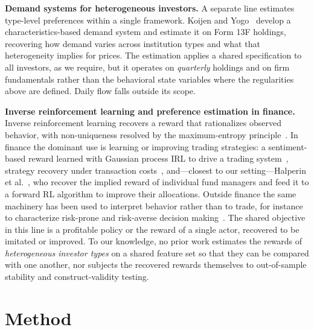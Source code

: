 \documentclass[sigconf,anonymous,review]{acmart}
\begin{document}
\textbf{Demand systems for heterogeneous investors.} A separate line
estimates type-level preferences within a single framework. Koijen and
Yogo~\cite{koijen_yogo2019} develop a characteristics-based demand system
and estimate it on Form 13F holdings, recovering how demand varies across
institution types and what that heterogeneity implies for prices. The
estimation applies a shared specification to all investors, as we
require, but
it operates on \emph{quarterly} holdings and on firm fundamentals rather
than the behavioral state variables where the regularities above are
defined. Daily flow falls outside its scope.

\textbf{Inverse reinforcement learning and preference estimation in
finance.} Inverse reinforcement learning recovers a reward that
rationalizes observed behavior, with non-uniqueness resolved by the
maximum-entropy principle~\cite{ziebart2008}. In finance the dominant use is
learning or improving trading strategies: a sentiment-based reward
learned with Gaussian process IRL to drive a trading
system~\cite{yang2018gpirl}, strategy recovery under transaction
costs~\cite{sun2023transaction}, and---closest to our setting---Halperin
et al.~\cite{halperin2022}, who recover the implied reward of individual
fund managers and feed it to a forward RL algorithm to improve their
allocations. Outside finance the same machinery has been used to
interpret behavior rather than to trade, for instance to characterize
risk-prone and risk-averse decision making~\cite{liu2019risk}. The shared objective in this line is a profitable policy or
the reward of a single actor, recovered to be imitated or improved. To our knowledge, no prior work estimates the rewards of
\emph{heterogeneous investor types} on a shared feature set so that they
can be compared with one another, nor subjects the recovered rewards
themselves to out-of-sample stability and construct-validity testing.

\section{Method}
\label{sec:method}
\end{document}
